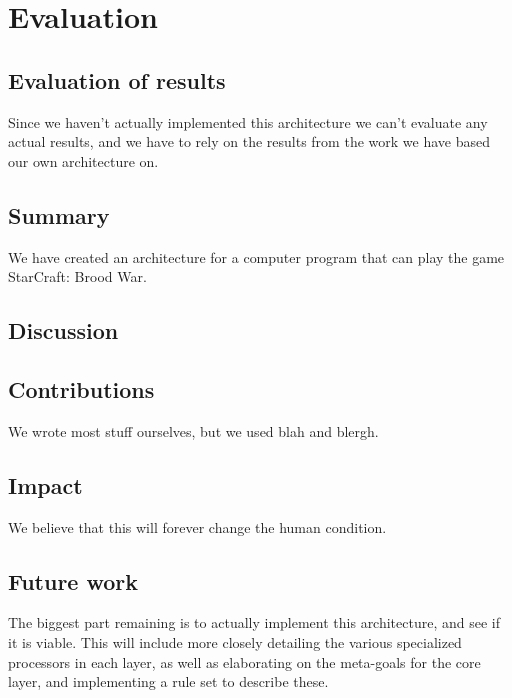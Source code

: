 \chapter{Evaluation}
\section{Evaluation of results}
Since we haven't actually implemented this architecture we can't evaluate any
actual results, and we have to rely on the results from the work we have based
our own architecture on.

\section{Summary}
We have created an architecture for a computer program that can play the game
StarCraft: Brood War.


\section{Discussion}


\section{Contributions}
We wrote most stuff ourselves, but we used blah and blergh.


\section{Impact}
We believe that this will forever change the human condition.


\section{Future work}
The biggest part remaining is to actually implement this architecture, and see
if it is viable. This will include more closely detailing the various
specialized processors in each layer, as well as elaborating on the meta-goals
for the core layer, and implementing a rule set to describe these.